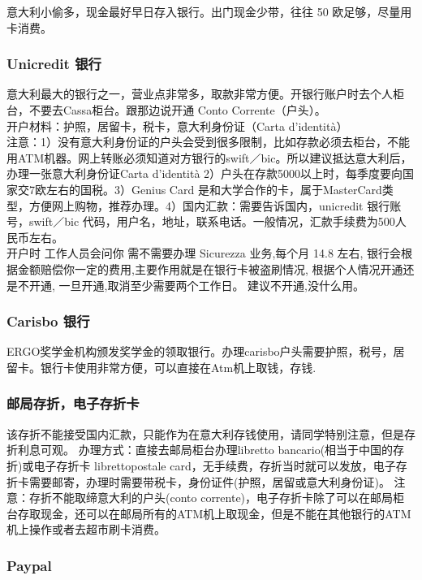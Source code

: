 意大利小偷多，现金最好早日存入银行。出门现金少带，往往 50 欧足够，尽量用卡消费。

\subsubsection{Unicredit 银行}

意大利最大的银行之一，营业点非常多，取款非常方便。开银行账户时去个人柜台，不要去Cassa柜台。跟那边说开通 Conto Corrente（户头）。\\
开户材料：护照，居留卡，税卡，意大利身份证（Carta d’identità）\\
注意：1）没有意大利身份证的户头会受到很多限制，比如存款必须去柜台，不能用ATM机器。网上转账必须知道对方银行的swift／bic。所以建议抵达意大利后，办理一张意大利身份证Carta d’identità 2）户头在存款5000以上时，每季度要向国家交7欧左右的国税。3）Genius Card 是和大学合作的卡，属于MasterCard类型，方便网上购物，推荐办理。4）国内汇款：需要告诉国内，unicredit 银行账号，swift／bic 代码，用户名，地址，联系电话。一般情况，汇款手续费为500人民币左右。\\
开户时 工作人员会问你 需不需要办理 Sicurezza 业务,每个月 14.8 左右, 银行会根据金额赔偿你一定的费用,主要作用就是在银行卡被盗刷情况, 根据个人情况开通还是不开通, 一旦开通,取消至少需要两个工作日。 建议不开通,没什么用。

\subsubsection{Carisbo 银行}
ERGO奖学金机构颁发奖学金的领取银行。办理carisbo户头需要护照，税号，居留卡。银行卡使用非常方便，可以直接在Atm机上取钱，存钱.

\subsubsection{邮局存折，电子存折卡}

该存折不能接受国内汇款，只能作为在意大利存钱使用，请同学特别注意，但是存折利息可观。
办理方式：直接去邮局柜台办理libretto bancario(相当于中国的存折)或电子存折卡 librettopostale card，无手续费，存折当时就可以发放，电子存折卡需要邮寄，办理时需要带税卡，身份证件(护照，居留或意大利身份证)。
注意：存折不能取缔意大利的户头(conto corrente)，电子存折卡除了可以在邮局柜台存取现金，还可以在邮局所有的ATM机上取现金，但是不能在其他银行的ATM机上操作或者去超市刷卡消费。

\subsubsection{Paypal}

